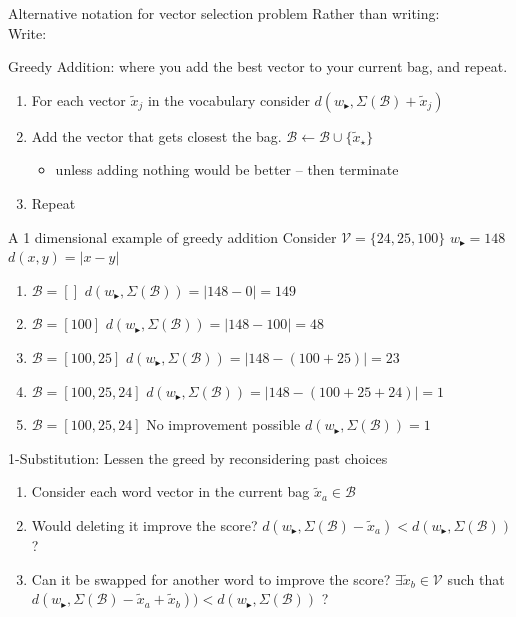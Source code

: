 \documentclass[]{beamer}
\newcommand{\x}{\tilde{x}}
\newcommand{\V}{\mathcal{V}}
\newcommand{\B}{\mathcal{B}}
\newcommand{\s}{w_{\blacktriangleright}}
\begin{document}
\begin{frame}{Alternative notation for vector selection problem}
	Rather than writing:\\
	\vectorselectionproblemdefn
	\vfill
	Write:\\
	\vectorselectionproblemdefnalt
	\vfill
\end{frame}


\begin{frame}{Greedy Addition: where you add the best vector to your current bag, and repeat.}
	\vectorselectionproblemdefnalt
	\vfill
	\begin{enumerate}
		\item For each vector $\x_j$ in the vocabulary consider  $d(\s, \Sigma(\B)+\x_j)$
		\item Add the vector that gets closest the bag. $\B\leftarrow\B\cup\{\x_\star\}$
		\begin{itemize}
			\item unless adding nothing would be better -- then terminate
		\end{itemize}
		\item Repeat
	\end{enumerate}
	\vfill
\end{frame}

\begin{frame}{A 1 dimensional example of greedy addition}
	\vectorselectionproblemdefnalt
	\vfill
	Consider $\V=\{24,25,100\}$ \hfill $\s=148$ \hfill $d(x,y)=|x-y|$
	\begin{enumerate}
		\item<1-> $\B=[]$ \hfill $d(\s,\Sigma(\B))=|148-0|=149$ 
		\item<2-> $\B=[100]$ \hfill $d(\s,\Sigma(\B))=|148-100|=48$ 
		\item<3-> $\B=[100,25]$ \hfill $d(\s,\Sigma(\B))=|148-(100+25)|=23$ 
		\item<4-> $\B=[100,25,24]$ \hfill $d(\s,\Sigma(\B))=|148-(100+25+24)|=1$ 
		\item<5-> $\B=[100,25,24]$ \hfill No improvement possible \hfill $d(\s,\Sigma(\B))=1$ 
	\end{enumerate}
	\vfill
	\vfill
\end{frame}

\begin{frame}{1-Substitution: Lessen the greed by reconsidering past choices}
	\vectorselectionproblemdefnalt
	\vfill
	\begin{enumerate}
		\item Consider each word vector in the current bag $\x_a\in\B$
		\item Would deleting it improve the score? $d(\s,\Sigma(\B)-\x_a)<d(\s,\Sigma(\B))$ ?
		\item Can it be swapped for another word to improve the score?
		$\exists \x_b\in\V$ such that
		$d(\s,\Sigma(\B)-\x_a+\x_b))<d(\s,\Sigma(\B))$ ?
	\end{enumerate}
\end{frame}
\end{document}

